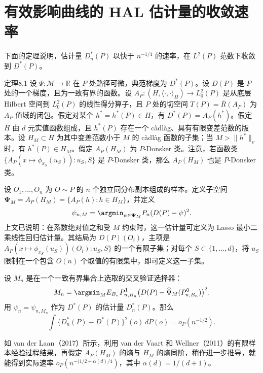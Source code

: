 \section{有效影响曲线的 HAL 估计量的收敛速率}

下面的定理说明，估计量 $D_n^*(P)$ 以快于 $n^{-1/4}$ 的速率，在 $L^2(P)$ 范数下收敛到 $D^*(P)$。

\begin{bookresult}{定理}{8.1}
设 $\Psi:\mathcal M\to\mathbb R$ 在 $P$ 处路径可微，典范梯度为 $D^*(P)$。设 $D(P)$ 是 $P$ 处的一个梯度，且为一致有界的函数。设
$A_P:(H,\langle\cdot,\cdot\rangle_H)\to L_0^2(P)$
是从底层 Hilbert 空间到 $L_0^2(P)$ 的线性得分算子，且 $P$ 处的切空间 $T(P)=\overline R(A_P)$ 为 $A_P$ 值域的闭包。假定对某个 $h^*=h^*(P)\in H$，有 $D^*(P)=A_P(h^*)$。假定 $H$ 由 $d$ 元实值函数组成，且 $h^*(P)$ 存在一个 càdlàg、具有有限变差范数的版本。设 $H_M\subset H$ 为其中变差范数小于 $M$ 的 càdlàg 函数的子集；当 $M>\|h^*\|_v$ 时，有 $h^*(P)\in H_M$。假定 $A_P(H_M)$ 为 $P$-Donsker 类。注意，若函数类
$\{A_P(x\mapsto\phi_{x_S}(u_S)):u_S,S\}$
是 $P$-Donsker 类，那么 $A_P(H_M)$ 也是 $P$-Donsker 类。

设 $O_1,\ldots,O_n$ 为 $O\sim P$ 的 $n$ 个独立同分布副本组成的样本。定义子空间
$\boldsymbol{\Psi}_M=A_P(H_M)=\{A_P(h):h\in H_M\}$，并定义
\[
 \psi_{n,M}=\argmin_{\psi\in\boldsymbol{\Psi}_M}P_n(D(P)-\psi)^2.
\]
上文已说明：在系数绝对值之和受 $M$ 约束时，这一估计量可定义为 Lasso 最小二乘线性回归估计量。其结局为 $D(P)(O_i)$，主项是
$A_P(x\mapsto\phi_{x_S}(u_S))(O_i):u_S,S\}$
的一个有限子集；对每个 $S\subset\{1,\ldots,d\}$，将 $u_S$ 限制在一个包含 $O(n)$ 个取值的有限集中，即可定义这一子集。

设 $M_n$ 是在一个一致有界集合上选取的交叉验证选择器：
\[
 M_n=\argmin_M E_{B_n}P_{n,B_n}^1
 \bigl(D(P)-\widehat\Psi_M(P_{n,B_n}^0)\bigr)^2.
\]
用 $\psi_n=\psi_{n,M_n}$ 作为 $D^*(P)$ 的估计量 $D_n^*(P)$。那么
\[
 \int\{D_n^*(P)-D^*(P)\}^2(o)\,dP(o)=o_P(n^{-1/2}).
\]
\end{bookresult}

如 van der Laan（2017）所示，利用 van der Vaart 和 Wellner（2011）的有限样本经验过程结果，再假定 $A_P(H_M)$ 的熵与 $H_M$ 的熵同阶，稍作进一步推导，就能得到实际速率
$o_P(n^{-(1/2+\alpha(d)/4})$，其中 $\alpha(d)=1/(d+1)$。

